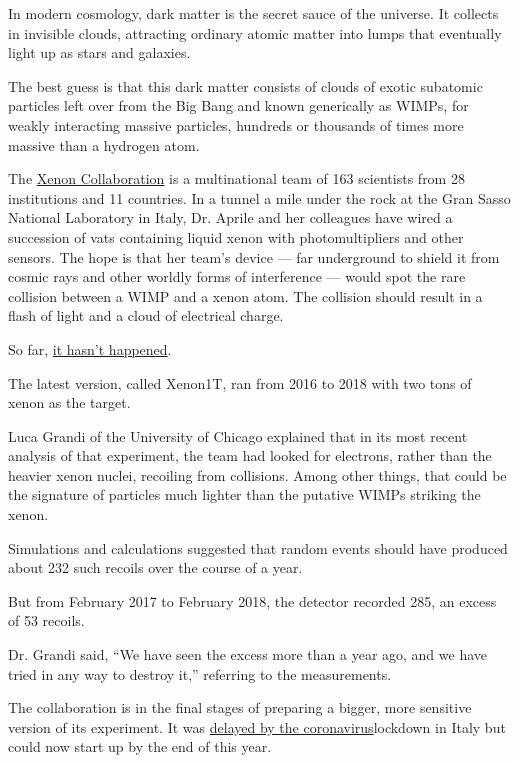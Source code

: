 In modern cosmology, dark matter is the secret sauce of the universe. It
collects in invisible clouds, attracting ordinary atomic matter into
lumps that eventually light up as stars and galaxies.

The best guess is that this dark matter consists of clouds of exotic
subatomic particles left over from the Big Bang and known generically as
WIMPs, for weakly interacting massive particles, hundreds or thousands
of times more massive than a hydrogen atom.

The \href{http://www.xenon1t.org/}{Xenon Collaboration} is a
multinational team of 163 scientists from 28 institutions and 11
countries. In a tunnel a mile under the rock at the Gran Sasso National
Laboratory in Italy, Dr. Aprile and her colleagues have wired a
succession of vats containing liquid xenon with photomultipliers and
other sensors. The hope is that her team's device --- far underground to
shield it from cosmic rays and other worldly forms of interference ---
would spot the rare collision between a WIMP and a xenon atom. The
collision should result in a flash of light and a cloud of electrical
charge.

So far,
\href{https://www.nytimes3xbfgragh.onion/2013/10/31/science/space/dark-matter-experiment-has-found-nothing-scientists-say-proudly.html}{it
hasn't happened}.

The latest version, called Xenon1T, ran from 2016 to 2018 with two tons
of xenon as the target.

Luca Grandi of the University of Chicago explained that in its most
recent analysis of that experiment, the team had looked for electrons,
rather than the heavier xenon nuclei, recoiling from collisions. Among
other things, that could be the signature of particles much lighter than
the putative WIMPs striking the xenon.

Simulations and calculations suggested that random events should have
produced about 232 such recoils over the course of a year.

But from February 2017 to February 2018, the detector recorded 285, an
excess of 53 recoils.

Dr. Grandi said, ``We have seen the excess more than a year ago, and we
have tried in any way to destroy it,'' referring to the measurements.

The collaboration is in the final stages of preparing a bigger, more
sensitive version of its experiment. It was
\href{https://www.nytimes3xbfgragh.onion/2020/04/07/science/dark-matter-elena-aprile-coronavirus.html}{delayed
by the coronavirus}lockdown in Italy but could now start up by the end
of this year.

